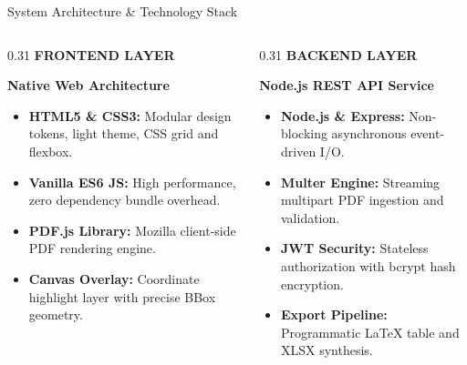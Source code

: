 \documentclass[aspectratio=169,10pt]{beamer}
\begin{document}
\begin{frame}{System Architecture \& Technology Stack}
\vspace{-0.15cm}
\begin{columns}[T]
  \begin{column}{0.31\textwidth}
    {\fontsize{7pt}{8.5pt}\selectfont\bfseries\color{SubText} FRONTEND LAYER}\par\vspace{2pt}
    {\fontsize{9.5pt}{11.5pt}\selectfont\bfseries\color{DarkText} Native Web Architecture}\par\vspace{4pt}
    {\fontsize{7.2pt}{9.2pt}\selectfont\color{DarkText}
    \begin{itemize}
      \item \textbf{HTML5 \& CSS3:} Modular design tokens, light theme, CSS grid and flexbox.
      \item \textbf{Vanilla ES6 JS:} High performance, zero dependency bundle overhead.
      \item \textbf{PDF.js Library:} Mozilla client-side PDF rendering engine.
      \item \textbf{Canvas Overlay:} Coordinate highlight layer with precise BBox geometry.
    \end{itemize}}
  \end{column}

  \begin{column}{0.31\textwidth}
    {\fontsize{7pt}{8.5pt}\selectfont\bfseries\color{SubText} BACKEND LAYER}\par\vspace{2pt}
    {\fontsize{9.5pt}{11.5pt}\selectfont\bfseries\color{DarkText} Node.js REST API Service}\par\vspace{4pt}
    {\fontsize{7.2pt}{9.2pt}\selectfont\color{DarkText}
    \begin{itemize}
      \item \textbf{Node.js \& Express:} Non-blocking asynchronous event-driven I/O.
      \item \textbf{Multer Engine:} Streaming multipart PDF ingestion and validation.
      \item \textbf{JWT Security:} Stateless authorization with bcrypt hash encryption.
      \item \textbf{Export Pipeline:} Programmatic LaTeX table and XLSX synthesis.
    \end{itemize}}
  \end{column}


\end{columns}
\end{frame}
\end{document}

